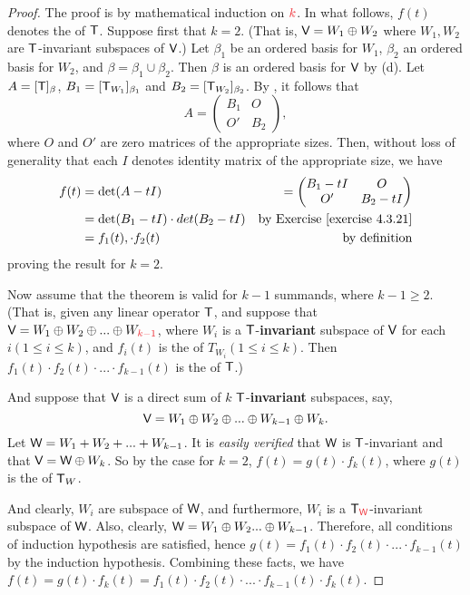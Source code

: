 \begin{proof}
The proof is by mathematical induction on \(\RED{k}\).
In what follows, \(f(t)\) denotes the \CPOLY{} of \(\textsf{T}\).
Suppose first that \(k = 2\).
(That is, \(\textsf{V} = W_1 \oplus W_2\) where \(W_1, W_2\) are \(\textsf{T}\)-invariant subspaces of \(\textsf{V}\).)
Let \(\beta_1\) be an ordered basis for \(W_1\), \(\beta_2\) an ordered basis for \(W_2\), and \(\beta = \beta_1 \cup \beta_2\).
Then \(\beta\) is an ordered basis for \(\textsf{V}\) by (d).
Let \(A = [\textsf{T}]_{\beta}\), \(B_1 = [\textsf{T}_{W_1}]_{\beta_1}\) and \(B_2 = [\textsf{T}_{W_2}]_{\beta_2}\).
By , it follows that
\[
    A = \begin{pmatrix}
        B_1 & O \\
        O' & B_2
    \end{pmatrix},
\]
where \(O\) and \(O'\) are zero matrices of the appropriate sizes.
Then, without loss of generality that each \(I\) denotes identity matrix of the appropriate size, we have
\begin{align*}
    f(t) & = \det(A - tI) & = \begin{pmatrix} B_1 - tI & O \\ O' & B_2 - tI \end{pmatrix}\\
         & = \det(B_1 - tI) \cdot det(B_2 - tI) & \text{by \EXEC{4.3.21}} \\
         & = f_1(t), \cdot f_2(t) & \text{by definition}
\end{align*}
proving the result for \(k = 2\).

Now assume that the theorem is valid for \(k - 1\) summands, where \(k - 1 \ge 2\).
(That is, given any linear operator \(\textsf{T}\), and suppose that \(\V = W_1 \oplus W_2 \oplus ... \oplus W_{\RED{k - 1}}\), where \(W_i\) is a \(\textsf{T}\)-\textbf{invariant} subspace of \(\textsf{V}\) for each \(i (1 \le i \le k)\), and \(f_i(t)\) is the \CPOLY{} of \(T_{W_i} (1 \le i \le k)\).
Then \(f_1(t) \cdot f_2(t) \cdot ... \cdot f_{k - 1}(t)\) is the \CPOLY{} of \(\textsf{T}\).)

And suppose that \(\textsf{V}\) is a direct sum of \(k\) \(\textsf{T}\)-\textbf{invariant}\RED{*} subspaces, say,
\[
    \textsf{V} = W_1 \oplus W_2 \oplus ... \oplus W_{k - 1} \oplus W_k.
\]
Let \(\textsf{W} = W_1 + W_2 + ... + W_{k - 1}\).
It is \emph{easily verified} that \(\textsf{W}\) is \(\textsf{T}\)-invariant and that \(\textsf{V} = \textsf{W} \oplus W_k\).
So by the case for \(k = 2\), \(f(t) = g(t) \cdot f_k(t)\), where \(g(t)\) is the \CPOLY{} of \(\textsf{T}_W\).

\RED{**}And clearly, \(W_i\) are subspace of \(\textsf{W}\), and furthermore, \(W_i\) is a \(\T_{\RED{\W}}\)-invariant subspace of \(\textsf{W}\).
Also, clearly, \(\textsf{W} = W_1 \oplus W_2 ... \oplus W_{k - 1}\).
Therefore, all conditions of induction hypothesis are satisfied, hence \(g(t) = f_1(t) \cdot f_2(t) \cdot ... \cdot f_{k - 1}(t)\) by the induction hypothesis.
Combining these facts, we have \(f(t) = g(t) \cdot f_k(t) = f_1(t) \cdot f_2(t) \cdot ... \cdot f_{k - 1}(t) \cdot f_k(t)\).
\end{proof}

